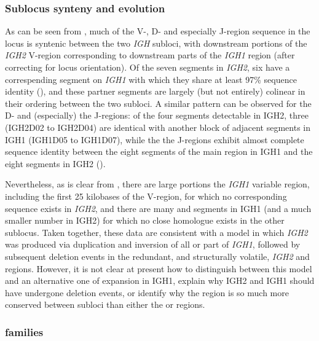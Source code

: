 	\subsubsection{Sublocus synteny and evolution}
	\label{sec:nfu-locus-variable-synteny}

		As can be seen from , much of the V-, D- and especially J-region sequence in the \Nfu locus is syntenic between the two \textit{IGH} subloci, with downstream portions of the \textit{IGH2} V-region corresponding to downstream parts of the \textit{IGH1} region (after correcting for locus orientation). Of the seven \vh segments in \textit{IGH2}, six have a correspending segment on \textit{IGH1} with which they share at least 97\% sequence identity (), and these partner segments are largely (but not entirely) colinear in their ordering between the two subloci. A similar pattern can be observed for the D- and (especially) the J-regions: of the four \dh segments detectable in IGH2, three (IGH2D02 to IGH2D04) are identical with another block of adjacent \dh segments in IGH1 (IGH1D05 to IGH1D07), while the the J-regions exhibit almost complete sequence identity between the eight \jh segments of the main \jh region in IGH1 and the eight \jh segments in IGH2 ().
		
		Nevertheless, as is clear from , there are large portions the \textit{IGH1} variable region, including the first 25 kilobases of the V-region, for which no corresponding sequence exists in \textit{IGH2}, and there are many \vh and \dh segments in IGH1 (and a much smaller number in IGH2) for which no close homologue exists in the other sublocus. Taken together, these data are consistent with a model in which \textit{IGH2} was produced via duplication and inversion of all or part of \textit{IGH1}, followed by subsequent deletion events in the redundant, and structurally volatile, \textit{IGH2} \vh and \dh regions. However, it is not clear at present how to distinguish between this model and an alternative one of expansion in IGH1, explain why IGH2 and IGH1 should have undergone deletion events, or identify why the \jh region is so much more conserved between subloci than either the \vh or \jh regions.
		

	\subsubsection{\vh families}
	\label{sec:nfu-locus-variable-families}
	
